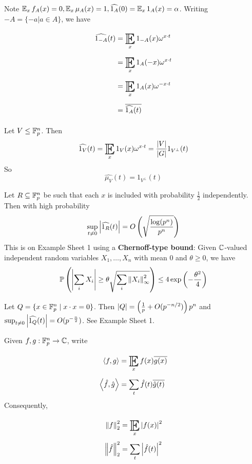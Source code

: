 \documentclass{article}
\begin{document}
Note $\E_x f_A(x) = 0, \E_x \mu_A(x) = 1, \widehat{1_A}(0) = \E_x 1_A(x) = \alpha$. Writing $-A = \{-a | a \in A\}$, we have
\begin{align*}
  \widehat{1_{-A}}(t)
  & = \E_x 1_{-A}(x) \omega^{x \cdot t} \\
  & = \E_x 1_A(-x) \omega^{x \cdot t} \\
  & = \E_x 1_A(x) \omega^{-x \cdot t} \\
  & = \overline{\widehat{1_A}(t)}
\end{align*}

\begin{eg}\label{ex:dft-subspace}
  Let $V \le \mathbb F_p^n$. Then
  $$\widehat{1_V}(t) = \E_x 1_V(x) \omega^{x \cdot t} = \frac{\abs V}{\abs G} 1_{V^\perp}(t)$$
  So
  $$\widehat{\mu_V}(t) = 1_{V^\perp}(t)$$
\end{eg}

\begin{eg}\label{ex:dft-random-set}
  Let $R \subseteq \mathbb F_p^n$ be such that each $x$ is included with probability $\frac 12$ independently. Then with high probability
  $$\sup_{t \ne 0} \left\lvert \widehat{1_R}(t)\right\rvert = O\left(\sqrt{\frac{\log(p^n)}{p^n}}\right)$$
  This is on Example Sheet 1 using a {\bf Chernoff-type bound}: Given $\mathbb C$-valued independent random variables $X_1, \dots, X_n$ with mean $0$ and $\theta \ge 0$, we have
  $$\mathbb P\left(\left\lvert \sum_i X_i\right\rvert \ge \theta\sqrt{\sum_i \left\lVert X_i\right\rVert^2_\infty}\right) \le 4\exp\left(-\frac{\theta^2}4\right)$$
\end{eg}

\begin{eg}
  Let $Q = \{x \in \mathbb F_p^n \mid x \cdot x = 0\}$. Then $\left\lvert Q\right\rvert = \left(\frac 1p + O(p^{-n/2})\right)p^n$ and $\sup_{t \ne 0} \left\lvert \widehat{1_Q}(t)\right\rvert = O(p^{-\frac n2})$. See Example Sheet 1.
\end{eg}

\begin{notation}
  Given $f, g : \mathbb F_p^n \to \mathbb C$, write
  \begin{align*}
    \inn f g & = \E_x f(x) \overline{g(x)} \\
    \inn{\hat f}{\hat g} & = \sum_t \hat f(t) \overline{\hat g(t)}
  \end{align*}
  Consequently,
  \begin{align*}
    \norm f_2^2 & = \E_x \abs{f(x)}^2 \\
    \norm{\hat f}_2^2 & = \sum_t \abs{\hat f(t)}^2
  \end{align*}
\end{notation}
\end{document}
